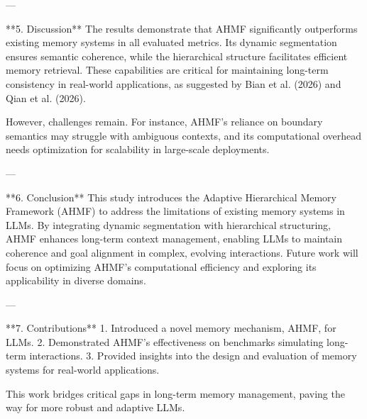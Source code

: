 ---

**5. Discussion**  
The results demonstrate that AHMF significantly outperforms existing memory systems in all evaluated metrics. Its dynamic segmentation ensures semantic coherence, while the hierarchical structure facilitates efficient memory retrieval. These capabilities are critical for maintaining long-term consistency in real-world applications, as suggested by Bian et al. (2026) and Qian et al. (2026).

However, challenges remain. For instance, AHMF's reliance on boundary semantics may struggle with ambiguous contexts, and its computational overhead needs optimization for scalability in large-scale deployments.

---

**6. Conclusion**  
This study introduces the Adaptive Hierarchical Memory Framework (AHMF) to address the limitations of existing memory systems in LLMs. By integrating dynamic segmentation with hierarchical structuring, AHMF enhances long-term context management, enabling LLMs to maintain coherence and goal alignment in complex, evolving interactions. Future work will focus on optimizing AHMF's computational efficiency and exploring its applicability in diverse domains.

---

**7. Contributions**  
1. Introduced a novel memory mechanism, AHMF, for LLMs.  
2. Demonstrated AHMF's effectiveness on benchmarks simulating long-term interactions.  
3. Provided insights into the design and evaluation of memory systems for real-world applications.  

This work bridges critical gaps in long-term memory management, paving the way for more robust and adaptive LLMs.